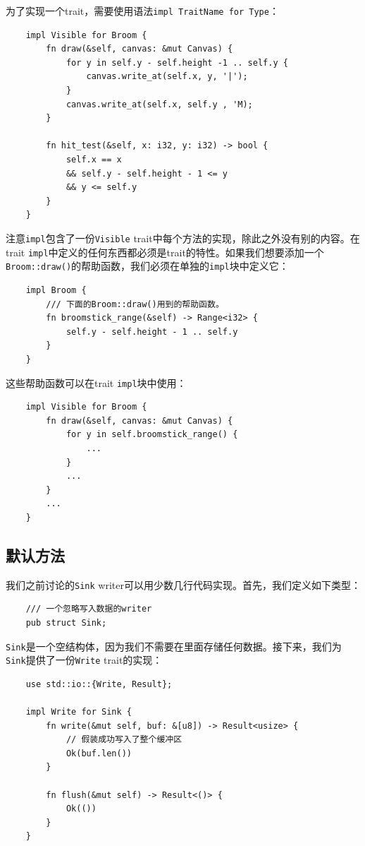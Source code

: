 为了实现一个trait，需要使用语法\texttt{impl TraitName for Type}：
\begin{verbatim}
    impl Visible for Broom {
        fn draw(&self, canvas: &mut Canvas) {
            for y in self.y - self.height -1 .. self.y {
                canvas.write_at(self.x, y, '|');
            }
            canvas.write_at(self.x, self.y , 'M);
        }

        fn hit_test(&self, x: i32, y: i32) -> bool {
            self.x == x
            && self.y - self.height - 1 <= y
            && y <= self.y
        }
    }
\end{verbatim}

注意\texttt{impl}包含了一份\texttt{Visible} trait中每个方法的实现，除此之外没有别的内容。在trait \texttt{impl}中定义的任何东西都必须是trait的特性。如果我们想要添加一个\texttt{Broom::draw()}的帮助函数，我们必须在单独的\texttt{impl}块中定义它：

\begin{verbatim}
    impl Broom {
        /// 下面的Broom::draw()用到的帮助函数。
        fn broomstick_range(&self) -> Range<i32> {
            self.y - self.height - 1 .. self.y
        }
    }
\end{verbatim}

这些帮助函数可以在trait \texttt{impl}块中使用：
\begin{verbatim}
    impl Visible for Broom {
        fn draw(&self, canvas: &mut Canvas) {
            for y in self.broomstick_range() {
                ...
            }
            ...
        }
        ...
    }
\end{verbatim}

\subsection{默认方法}
我们之前讨论的\texttt{Sink} writer可以用少数几行代码实现。首先，我们定义如下类型：
\begin{verbatim}
    /// 一个忽略写入数据的writer
    pub struct Sink;
\end{verbatim}

\texttt{Sink}是一个空结构体，因为我们不需要在里面存储任何数据。接下来，我们为\texttt{Sink}提供了一份\texttt{Write} trait的实现：
\begin{verbatim}
    use std::io::{Write, Result};

    impl Write for Sink {
        fn write(&mut self, buf: &[u8]) -> Result<usize> {
            // 假装成功写入了整个缓冲区
            Ok(buf.len())
        }

        fn flush(&mut self) -> Result<()> {
            Ok(())
        }
    }
\end{verbatim}


